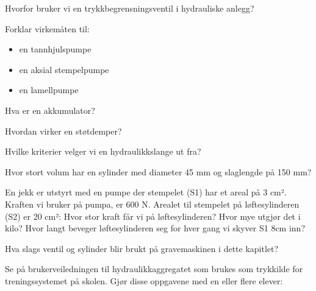 \documentclass[12pt,a4paper]{article}
\def\oppgave{
		}
\begin{document}
\vskip 2.5pt 
\oppgave{}%
\vskip 2.5pt 
Hvorfor bruker vi en trykkbegrensningsventil i hydrauliske anlegg?
\vskip 5pt 
\vskip 2.5pt 
\oppgave{}%
\vskip 2.5pt 
Forklar virkemåten til:
\begin{itemize}
	\item en tannhjulspumpe
	\item en aksial stempelpumpe
	\item en lamellpumpe
\end{itemize}
\vskip 5pt 
\vskip 2.5pt 
\oppgave{}%
\vskip 2.5pt 
Hva er en akkumulator?
\vskip 5pt 
\vskip 2.5pt 
\oppgave{}%
\vskip 2.5pt 
Hvordan virker en støtdemper?
\vskip 5pt 
\vskip 2.5pt 
\oppgave{}%
\vskip 2.5pt 
Hvilke kriterier velger vi en hydraulikkslange ut fra?
\vskip 5pt 
\vskip 2.5pt 
\oppgave{}%
\vskip 2.5pt 
Hvor stort volum har en sylinder med diameter 45 mm og slaglengde på 150 mm?
\vskip 5pt 
\vskip 2.5pt 
\oppgave{}%
\vskip 2.5pt 
En jekk er utstyrt med en pumpe der stempelet (S1) har et areal på 3 cm². Kraften vi bruker på pumpa, er 600 N. Arealet til stempelet på løftesylinderen (S2) er 20 cm²:
	Hvor stor kraft får vi på løftesylinderen?
	Hvor mye utgjør det i kilo?
	Hvor langt beveger løftesylinderen seg for hver gang vi skyver S1 8cm inn?
\vskip 5pt 
\vskip 2.5pt 
\oppgave{}%
\vskip 2.5pt 
Hva slags ventil og sylinder blir brukt på gravemaskinen i dette kapitlet?
\vskip 5pt 
\vskip 2.5pt 
\oppgave{}%
\vskip 2.5pt 
Se på brukerveiledningen til hydraulikkaggregatet som brukes som trykkilde for treningssystemet på skolen. Gjør disse oppgavene med en eller flere elever:
\end{document}
